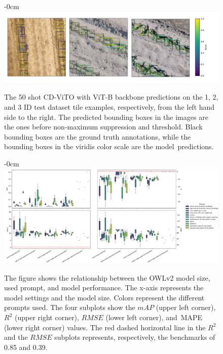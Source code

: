 \documentclass[12pt,a4paper,oneside]{report}
\newlength{\extralength}
\begin{document}
\begin{landscape}
\begin{figure}
  \begin{adjustwidth}{-\extralength}{0cm}
   \centering
  \includegraphics[width=22cm]{Plots/few_shot_annotations.pdf}
  \end{adjustwidth}
  \caption{The 50 shot CD-ViTO with ViT-B backbone predictions on the 
  1, 2, and 3 ID test dataset tile examples, respectively, from the left hand side to the right.
  The predicted bounding boxes in the images are the ones before 
  non-maximum suppression and threshold.
   Black bounding boxes are the ground truth annotations, while the bounding boxes 
   in the viridis color scale are the \mbox{model predictions.}}
  \label{fig:annotations_few-shot}
\end{figure}
\end{landscape}


\begin{landscape}
\begin{figure}
  \begin{adjustwidth}{-\extralength}{0cm}
  \centering
  \includegraphics[width=22cm]{Plots/zeroshot.pdf}
  \end{adjustwidth}
  \caption{The figure shows the relationship between the OWLv2 model size, used prompt,
  and model performance.
  The x-axis represents the model settings and the model size.
  Colors represent the different prompts used.
  The four subplots show the $mAP$ (upper left corner), $R^2$ (upper right corner),
  $RMSE$ (lower left corner), and~MAPE (lower right corner) values.
  The red dashed horizontal line in the $R^2$ and the $RMSE$ subplots represents, 
  respectively, the benchmarks of 0.85 and 0.39. 
  }
  \label{fig:zeroshots_vs_performance}
\end{figure}
\end{landscape}
\end{document}
